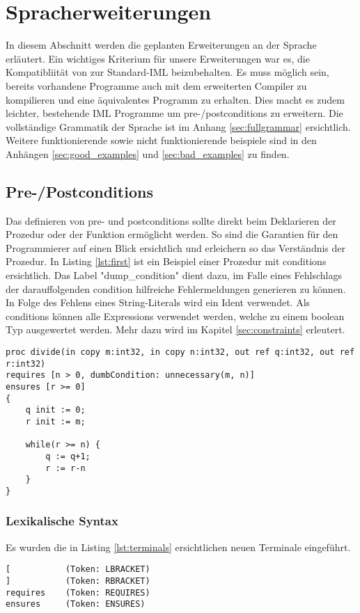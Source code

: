 \section{Spracherweiterungen}
In diesem Abschnitt werden die geplanten Erweiterungen an der Sprache erläutert. 
Ein wichtiges Kriterium für unsere Erweiterungen war es, die Kompatibliität von 
zur Standard-IML beizubehalten. Es muss möglich sein, bereits vorhandene Programme
auch mit dem erweiterten Compiler zu kompilieren und eine äquivalentes Programm zu 
erhalten. Dies macht es zudem leichter, bestehende IML Programme um pre-/postconditions
zu erweitern.
Die vollständige Grammatik der Sprache ist im Anhang \ref{sec:fullgrammar} 
ersichtlich. Weitere funktionierende sowie nicht funktionierende beispiele sind in den Anhängen
\ref{sec:good_examples} und \ref{sec:bad_examples} zu finden.

\subsection{Pre-/Postconditions}
Das definieren von pre- und postconditions sollte direkt beim Deklarieren
der Prozedur oder der Funktion ermöglicht werden. So sind die Garantien
für den Programmierer auf einen Blick ersichtlich und erleichern so 
das Verständnis der Prozedur. In Listing \ref{lst:first} ist ein Beispiel 
einer Prozedur mit conditions ersichtlich. Das Label "dump\_condition" dient dazu, im
Falle eines Fehlschlags der darauffolgenden condition hilfreiche Fehlermeldungen generieren zu können.
In Folge des Fehlens eines String-Literals wird ein Ident verwendet.
Als conditions können alle Expressions verwendet
werden, welche zu einem boolean Typ ausgewertet werden. Mehr dazu wird im 
Kapitel \ref{sec:constraints} erleutert.
\newline
\begin{lstlisting}[caption=Beispiele von pre-/postconditions,label={lst:first}]
proc divide(in copy m:int32, in copy n:int32, out ref q:int32, out ref r:int32)
requires [n > 0, dumbCondition: unnecessary(m, n)]
ensures [r >= 0]
{
    q init := 0;
    r init := m;

    while(r >= n) {
        q := q+1;
        r := r-n
    }
}
\end{lstlisting}

\subsubsection{Lexikalische Syntax}
Es wurden die in Listing \ref{lst:terminals} ersichtlichen neuen Terminale eingeführt.
\begin{lstlisting}[caption=Liste neuer Terminalsymbole,label=lst:terminals]
[           (Token: LBRACKET)
]           (Token: RBRACKET)
requires    (Token: REQUIRES)
ensures     (Token: ENSURES)
\end{lstlisting}

